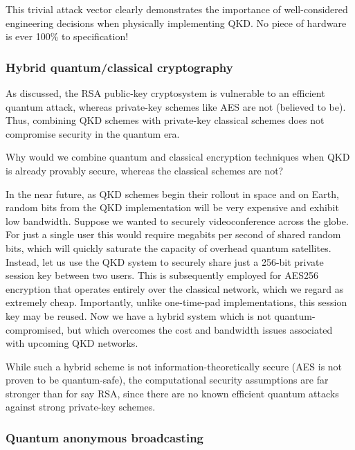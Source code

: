 This trivial attack vector clearly demonstrates the importance of well-considered engineering decisions when physically implementing QKD. No piece of hardware is ever 100\% to specification!


%
%

\subsubsection{Hybrid quantum/classical cryptography}

As discussed, the RSA public-key cryptosystem is vulnerable to an efficient quantum attack, whereas private-key schemes like AES are not (believed to be). Thus, combining QKD schemes with private-key classical schemes does not compromise security in the quantum era.

Why would we combine quantum and classical encryption techniques when QKD is already provably secure, whereas the classical schemes are not?

In the near future, as QKD schemes begin their rollout in space and on Earth, random bits from the QKD implementation will be very expensive and exhibit low bandwidth. Suppose we wanted to securely videoconference across the globe. For just a single user this would require megabits per second of shared random bits, which will quickly saturate the capacity of overhead quantum satellites. Instead, let us use the QKD system to securely share just a 256-bit private session key between two users. This is subsequently employed for AES256 encryption that operates entirely over the classical network, which we regard as extremely cheap. Importantly, unlike one-time-pad implementations, this session key may be reused. Now we have a hybrid system which is not quantum-compromised, but which overcomes the cost and bandwidth issues associated with upcoming QKD networks.

While such a hybrid scheme is not information-theoretically secure (AES is not proven to be quantum-safe), the computational security assumptions are far stronger than for say RSA, since there are no known efficient quantum attacks against strong private-key schemes.

%
%

\subsubsection{Quantum anonymous broadcasting} \label{sec:anon_broad} 


